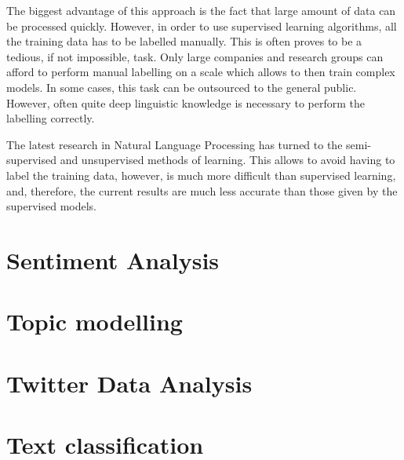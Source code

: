 The biggest advantage of this approach is the fact that large amount of data can be processed quickly. However, in order to use supervised learning algorithms, all the training data has to be labelled manually. This is often proves to be a tedious, if not impossible, task. Only large companies and research groups can afford to perform manual labelling on a scale which allows to then train complex models. In some cases, this task can be outsourced to the general public. However, often quite deep linguistic knowledge is necessary to perform the labelling correctly. 

The latest research in Natural Language Processing has turned to the semi-supervised and unsupervised methods of learning. This allows to avoid having to label the training data, however, is much more difficult than supervised learning, and, therefore, the current results are much less accurate than those given by the supervised models.


\section{Sentiment Analysis}
\label{sec:sentiment_analysis}

\section{Topic modelling}
\label{sec:topic_modelling}

\section{Twitter Data Analysis}
\label{sec:twitter_analysis}

\section{Text classification}
\label{sec:text_classification}

 
 